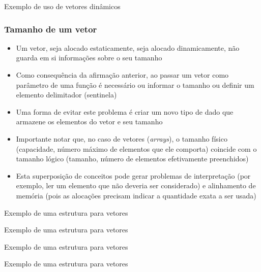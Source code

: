\begin{frame}[fragile]{Exemplo de uso de vetores dinâmicos}
\end{frame}

\begin{frame}

	\frametitle{Tamanho de um vetor}

	\begin{itemize}

		\item Um vetor, seja alocado estaticamente, seja alocado 
		dinamicamente, {não guarda} em si informações sobre o 
		seu tamanho

		\item Como consequência da afirmação anterior, ao passar um 
		vetor como parâmetro de uma função é necessário ou 
		{informar} o tamanho ou {definir} um elemento delimitador (sentinela)

		\item Uma forma de evitar este problema é criar um 
		{novo tipo de dado} que armazene os elementos do vetor e seu tamanho

        \item Importante notar que, no caso de vetores (\textit{arrays}), o tamanho físico
        (capacidade, número máximo de elementos que ele comporta) coincide com o tamanho lógico
        (tamanho, número de elementos efetivamente preenchidos)

        \item Esta superposição de conceitos pode gerar problemas de interpretação (por exemplo,
            ler um elemento que não deveria ser considerado) e alinhamento de memória (pois as
            alocações precisam indicar a quantidade exata a ser usada)
	\end{itemize}

\end{frame}

\begin{frame}[fragile]{Exemplo de uma estrutura para vetores}
\end{frame}

\begin{frame}[fragile]{Exemplo de uma estrutura para vetores}
\end{frame}

\begin{frame}[fragile]{Exemplo de uma estrutura para vetores}
\end{frame}

\begin{frame}[fragile]{Exemplo de uma estrutura para vetores}
\end{frame}
